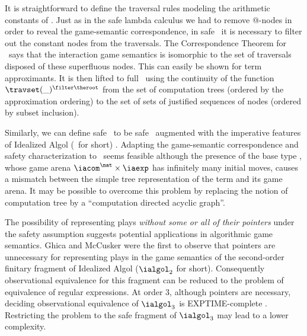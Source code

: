It is straightforward to define the traversal rules modeling the
arithmetic constants of \pcf. Just as in the safe lambda calculus we
had to remove @-nodes in order to reveal the game-semantic
correspondence, in safe \pcf\ it is necessary to filter out the
constant nodes from the traversals. The Correspondence Theorem for
\pcf\ says that the interaction game semantics is isomorphic to the
set of traversals disposed of these superfluous nodes. This can
easily be shown for term approximants. It is then lifted to full
\pcf\ using the continuity of the function $\travset(\_)^{\filter
\theroot}$ from the set of computation trees (ordered by the
approximation ordering) to the set of sets of justified sequences of
nodes (ordered by subset inclusion).



Similarly, we can define safe \ialgol\ to be safe \pcf\ augmented
with the imperative features of Idealized Algol (\ialgol\ for short)
\cite{Reynolds81}.  Adapting the game-semantic correspondence and
safety characterization to \ialgol\ seems feasible although the
presence of the base type \iavar, whose game arena $\iacom^{\nat}
\times \iaexp$ has infinitely many initial moves, causes a mismatch
between the simple tree representation of the term and its game
arena. It may be possible to overcome this problem by replacing the
notion of computation tree by a ``computation directed acyclic
graph''.

The possibility of representing plays \emph{without some or all of
  their pointers} under the safety assumption suggests potential
applications in algorithmic game semantics. Ghica and McCusker
\cite{ghicamccusker00} were the first to observe that pointers are
unnecessary for representing plays in the game semantics of the
second-order finitary fragment of Idealized Algol ($\ialgol_2$ for
short). Consequently observational equivalence for this fragment can
be reduced to the problem of equivalence of regular expressions.  At
order $3$, although pointers are necessary, deciding observational
equivalence of $\ialgol_3$ is EXPTIME-complete
\cite{DBLP:journals/apal/Ong04,DBLP:conf/fossacs/MurawskiW05}.
Restricting the problem to the safe fragment of $\ialgol_3$ may lead
to a lower complexity.

